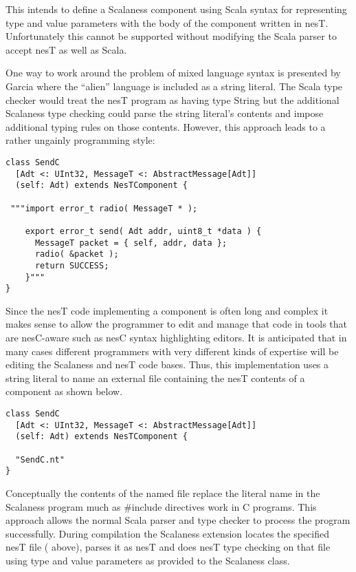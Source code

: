 This intends to define a Scalaness component using Scala syntax for representing type and value
parameters with the body of the component written in nesT. Unfortunately this cannot be supported
without modifying the Scala parser to accept nesT as well as Scala.

One way to work around the problem of mixed language syntax is presented by Garcia
\cite{Garcia-Scala-Query} where the ``alien'' language is included as a string literal. The
Scala type checker would treat the nesT program as having type String but the additional
Scalaness type checking could parse the string literal's contents and impose additional typing
rules on those contents. However, this approach leads to a rather ungainly programming style:

\singlespace
\vspace{1.0ex}
\begin{lstlisting}[language=scalaness]
class SendC
  [Adt <: UInt32, MessageT <: AbstractMessage[Adt]]
  (self: Adt) extends NesTComponent {

 """import error_t radio( MessageT * );

    export error_t send( Adt addr, uint8_t *data ) {
      MessageT packet = { self, addr, data };
      radio( &packet );
      return SUCCESS;
    }"""
}
\end{lstlisting}
\vspace{1.0ex}
\primaryspacing

Since the nesT code implementing a component is often long and complex it makes sense to allow
the programmer to edit and manage that code in tools that are nesC-aware such as nesC syntax
highlighting editors. It is anticipated that in many cases different programmers with very different
kinds of expertise will be editing the Scalaness and nesT code bases. Thus, this implementation
uses a string literal to name an external file containing the nesT contents of a component as
shown below.

\singlespace
\vspace{1.0ex}
\begin{lstlisting}[language=scalaness]
class SendC
  [Adt <: UInt32, MessageT <: AbstractMessage[Adt]]
  (self: Adt) extends NesTComponent {

  "SendC.nt"
}
\end{lstlisting}
\vspace{1.0ex}
\primaryspacing

Conceptually the contents of the named file replace the literal name in the Scalaness program
much as \#include directives work in C programs. This approach allows the normal Scala parser
and type checker to process the program successfully. During compilation the Scalaness extension
locates the specified nesT file ( above), parses it as nesT and does nesT
type checking on that file using type and value parameters as provided to the Scalaness class.

